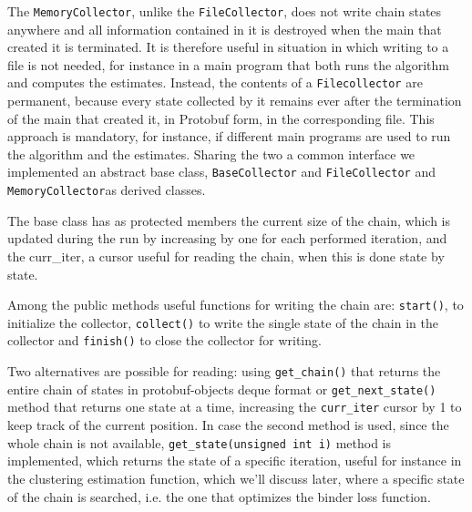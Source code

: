 The \verb|MemoryCollector|, unlike the \verb|FileCollector|, does not write chain states anywhere and all information contained in it is destroyed when the main that created it is terminated. It is therefore useful in situation in which writing to a file is not needed, for instance in a main program that both runs the algorithm and computes the estimates.
Instead, the contents of a \verb|Filecollector| are permanent, because every state collected by it remains ever after the termination of the main that created it, in Protobuf form, in the corresponding file. This approach is mandatory, for instance, if different main programs are used to run the algorithm and the estimates. 
Sharing the two a common interface we implemented an abstract base class, \verb|BaseCollector| and \verb|FileCollector| and \verb|MemoryCollector|as derived classes.

The base class has as protected members the current size of the chain, which is updated during the run by increasing by one for each performed  iteration, and the curr\_iter, a cursor useful for reading the chain, when this is done state by state.

Among the public methods useful functions for writing the chain are: \verb|start()|, to initialize the collector, \verb|collect()| to write the single state of the chain in the collector and \verb|finish()| to close the collector for writing. 

Two alternatives are possible for reading: using \verb|get_chain()| that returns the entire chain of states in protobuf-objects deque format or \verb|get_next_state()| method that returns one state at a time, increasing the \verb|curr_iter| cursor by 1 to keep track of the current position. In case the second method is used, since the whole chain is not available, \verb|get_state(unsigned int i)| method is implemented, which returns the state of a specific iteration, useful for instance in the clustering estimation function, which we'll discuss later, where a specific state of the chain is searched, i.e. the one that optimizes the binder loss function.

